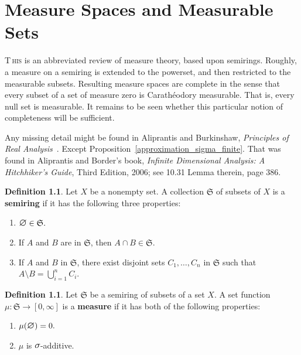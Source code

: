 \documentclass[
twoside=true,
paper=letter,
fontsize=9pt,
pagesize=auto,
leqno,
openany,
headsepline,
overfullrule,
]{scrbook}
\theoremstyle{plain}
\theoremstyle{plain}
\theoremstyle{definition}
\newtheorem{defn}[thm]{Definition}
\theoremstyle{bfnoteitalic}
\theoremstyle{bfnoteroman}
\newcommand{\term}[1]{\textbf{#1}\index{#1}}
\newcommand{\sigalg}[1]{\mathfrak{#1}}
\newcommand{\textsigma}{\hbox{\large{$\sigma$}}\kern-1pt}
\newcommand{\mtset}{\hbox{\large{$\varnothing$}}}
\newcommand{\meets}{\cap}
\newcommand{\semiring}{\sigalg{S}}
\newcommand{\measurespace}{X}
\newcommand{\measure}{\mu}
\begin{document}
\chapter{Measure Spaces and Measurable Sets}
\lettrine{T}{\,his} is an abbreviated review of measure theory, based upon semirings.
Roughly, a measure on a semiring is extended to the powerset, and then restricted to the measurable subsets.  Resulting measure spaces are complete in the sense that every subset of a set of measure zero is 
Carath\'{e}odory measurable. That is, every null set is measurable.
It remains to be seen whether this particular notion of completeness will be sufficient.


Any missing detail might be found in  Aliprantis and Burkinshaw, \textsl{Principles of Real Analysis}~\cite{pora_aliprantis_1990}. Except Proposition~\ref{approximation_sigma_finite}. That was found in Aliprantis and Border's book, \textsl{Infinite Dimensional Analysis: A Hitchhiker's Guide}, Third Edition, 2006; see 10.31 Lemma therein, page 386.

\begin{defn}
Let $\measurespace$ be a nonempty set.  A collection $\semiring$ of subsets of $\measurespace$ is a \textbf{semiring} if it has the following three properties:
\begin{enumerate} %
\item $\mtset\in\semiring.$
\item If $A$ and $B$ are in $\semiring$, then $A\meets B\in\semiring$. 
\item If  $A$ and $B$ in $\semiring$, there exist disjoint sets $C_1, \ldots , C_n$ in $\semiring$ such that $A\setminus B =\bigcup_{i=1}^{n}C_i$.
\end{enumerate}
\end{defn}

 
\begin{defn}
Let $\semiring$ be a semiring of subsets of a set $\measurespace$. A set function $\measure:\semiring\to [0,\infty]$ is a \term{measure} if it has both of the following properties:
\begin{enumerate}
\item $\measure(\mtset) = 0.$
\item $\measure$ is $\textsigma$-additive.
\end{enumerate} 
\end{defn} 
\end{document}

